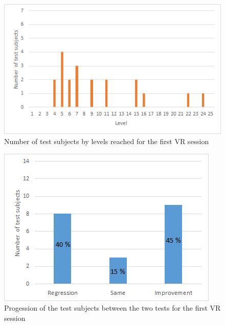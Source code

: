 \documentclass[12pt, openany, twocolumn]{article}
\begin{document}

        \begin{figure}
            \includegraphics[scale=0.74]{graphics/bargraph-vr-nbtestsujbectperlevel.png}
            \caption{Number of test subjects by levels reached for the first VR session}
        \end{figure}

        \begin{figure}
            \includegraphics[scale=0.74]{graphics/rsi-vr.png}
            \caption{Progession of the test subjects between the two tests for the first VR session}
        \end{figure}

                    
\end{document}
